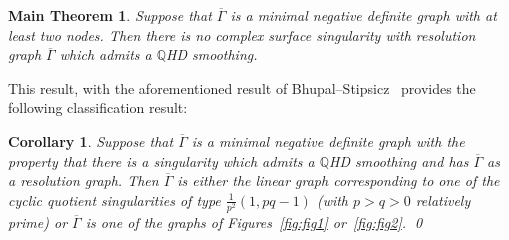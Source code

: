 \documentclass[a4paper, reqno, twoside]{amsart}
\newtheorem{corollary}[theorem]{Corollary}
\newtheorem{maintheorem}[theorem]{Main Theorem}
\theoremstyle{definition}
\numberwithin{equation}{section}
\begin{document}
\begin{maintheorem}
\label{thm:maintheorem}
Suppose that $\overline{\Gamma}$ is a minimal negative definite graph
with at least two nodes. Then there is no complex surface singularity
with resolution graph $\overline{\Gamma}$ which admits a {$\mathbb{Q}$HD smoothing\xspace}.
\end{maintheorem}

This result, with the aforementioned result of Bhupal--Stipsicz~\cite{Bhupal-Stipsicz-2011}
provides the following classification result:

\begin{corollary}\label{cor:ClassificationOfGraphs}
  Suppose that ${\overline{\Gamma}}$ is a minimal negative definite graph with
  the property that there is a singularity which admits a {$\mathbb{Q}$HD smoothing\xspace} and has
  ${\overline{\Gamma}}$ as a resolution graph. Then ${\overline{\Gamma}}$ is
  either the linear graph corresponding to one of the cyclic quotient
  singularities of type $\frac{1}{p^2}(1,pq-1)$ (with $p>q>0$ relatively
  prime) or ${\overline{\Gamma}}$ is one of the graphs of
  Figures~\ref{fig:fig1} or~\ref{fig:fig2}. \qed
\end{corollary}
\end{document}
